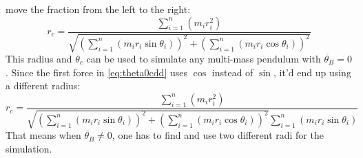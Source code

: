 \documentclass[titlepage]{article}
\numberwithin{equation}{section}
\begin{document}
move the fraction from the left to the right:
\begin{equation}
r_c = \frac{
    \sum_{i=1}^{n}(m_i r_i^2)
} {
    \sqrt{
        \left(\sum_{i=1}^{n}(m_i r_i \sin \theta_i)\right)^2
      + \left(\sum_{i=1}^{n}(m_i r_i \cos \theta_i)\right)^2
    }
}
\end{equation}
This radius and $\theta_c$ can be used to simulate any multi-mass pendulum with $\ddot{\theta_B} = 0$.
Since the first force in \ref{eq:theta0cdd} uses $\cos$ instead of $\sin$, it'd end up using a different radius:
\begin{equation}
r_c = \frac{
    \sum_{i=1}^{n}(m_i r_i^2)
} {
    \sqrt{
        \left(\sum_{i=1}^{n}(m_i r_i \sin \theta_i)\right)^2
      + \left(\sum_{i=1}^{n}(m_i r_i \cos \theta_i)\right)^2
    }
    \sum_{i=1}^{n}(m_i r_i \sin \theta_i)
}
\end{equation}
That means when $\ddot{\theta_B} \neq 0$, one has to find and use two different radi for the simulation.
\end{document}
